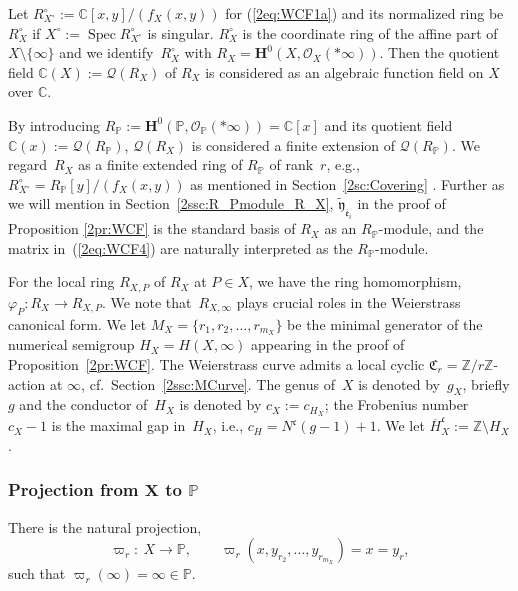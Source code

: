 \documentclass[10pt,a4paper]{amsart}
\def\CC{{\mathbb C}}
\def\ZZ{{\mathbb Z}}
\def\PP{{\mathbb P}}
\def\bH{{\mathbf F}}
\def\bH{{\mathbf H}}
\def\cO{{\mathcal O}}
\def\cQ{{\mathcal Q}}
\def\fC{{\mathfrak C}}
\def\fc{{\mathfrak c}}
\def\tfy{{\widetilde{\mathfrak y}}}
\def\Bfe{{\overline{\mathfrak e}}}
\def\lH{{\overline H}}
\def\Spec{\operatorname{Spec}}
\numberwithin{equation}{section}
\begin{document}
\begin{Remark}\label{2rm:g_Xc_X}
Let $R_{X^\circ}^\circ := \CC[x,y]/(f_X(x,y))$ for (\ref{2eq:WCF1a}) and its normalized ring be $R_X^\circ$ if $X^\circ:=\Spec R_{X^\circ}^\circ$ is singular.
$R_X^\circ$ is the coordinate ring of the affine part of $X\setminus\{\infty\}$ and we identify~$R_X^\circ$ with $R_X=\bH^0(X,\cO_X(*\infty))$.
Then the quotient field $\CC(X):=\cQ(R_X)$ of $R_X$ is considered as an algebraic function field on $X$ over $\CC$.

By introducing $R_\PP:=\bH^0(\PP, \cO_\PP(*\infty))=\CC[x]$ and its quotient field $\CC(x):=\cQ(R_\PP)$, $\cQ(R_X)$ is considered a finite extension of $\cQ(R_\PP)$.
We regard~$R_X$ as a finite extended ring of $R_\PP$ of rank~$r$, e.g., $R_{X^\circ}^\circ=R_\PP[y]/(f_X(x,y))$ as mentioned in Section~\ref{2sc:Covering} \cite{Kunz2004}.
Further as we will mention in Section~\ref{2ssc:R_Pmodule_R_X}, $\tfy_{\Bfe_{i}}$ in the proof of Proposition \ref{2pr:WCF} is the standard basis of $R_X$ as an $R_\PP$-module, and the matrix in~(\ref{2eq:WCF4}) are naturally interpreted as the $R_\PP$-module.

For the local ring $R_{X,P}$ of $R_X$ at $P \in X$, we have the ring homomorphism,
$\varphi_{P}\colon R_X\to R_{X,P}$.
We note that~$R_{X, \infty}$ plays crucial roles in the Weierstrass canonical form.
We let $M_X =\{ r_1, r_2, \dots, r_{m_X}\}$ be the minimal generator of the numerical semigroup $H_X=H(X, \infty)$ appearing in the proof of Proposition~\ref{2pr:WCF}.
The Weierstrass curve admits a local cyclic $\fC_r=\ZZ/r\ZZ$-action at $\infty$, cf.\ Section~\ref{2ssc:MCurve}.
The genus of~$X$ is denoted by~$g_X$, briefly $g$ and the conductor of~$H_X$ is denoted by $c_X:=c_{H_X}$; the Frobenius number $c_X-1$ is the maximal gap in~$H_X$, i.e., $c_H=N^\fc(g-1)+1$.
We let $\lH_X^\fc:=\ZZ\setminus H_X$.
\end{Remark}

\subsubsection[Projection from X to P]{Projection from $\boldsymbol{X}$ to $\boldsymbol{\PP}$}\label{2sssc:X_to_PP}

There is the natural projection,
\begin{equation*}
\varpi_{r}\colon \ X \to \PP, \qquad
\varpi_{r}(x,y_{r_2}, \dots, y_{r_{m_X}}) = x=y_r,%
\end{equation*}
such that $\varpi_{r}(\infty) = \infty\in \PP$.
\end{document}
